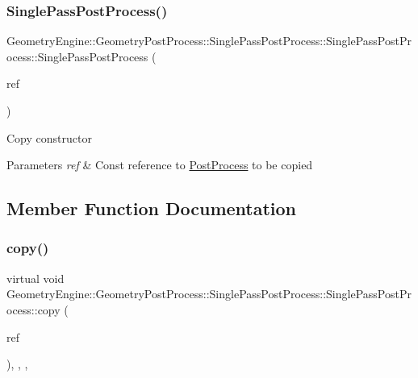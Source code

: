 \subsubsection{\texorpdfstring{SinglePassPostProcess()}{SinglePassPostProcess()}\hspace{0.1cm}{\footnotesize\ttfamily [2/2]}}
{\footnotesize\ttfamily Geometry\+Engine\+::\+Geometry\+Post\+Process\+::\+Single\+Pass\+Post\+Process\+::\+Single\+Pass\+Post\+Process\+::\+Single\+Pass\+Post\+Process (\begin{DoxyParamCaption}\item[{const \mbox{\hyperlink{class_geometry_engine_1_1_geometry_post_process_1_1_single_pass_post_process_1_1_single_pass_post_process}{Single\+Pass\+Post\+Process}} \&}]{ref }\end{DoxyParamCaption})\hspace{0.3cm}{\ttfamily [inline]}}

Copy constructor 
\begin{DoxyParams}{Parameters}
{\em ref} & Const reference to \mbox{\hyperlink{class_geometry_engine_1_1_geometry_post_process_1_1_post_process}{Post\+Process}} to be copied \\
\hline
\end{DoxyParams}


\subsection{Member Function Documentation}
\mbox{\label{class_geometry_engine_1_1_geometry_post_process_1_1_single_pass_post_process_1_1_single_pass_post_process_ab47b36f68057dcff05402a9e5a630878}} 
\subsubsection{\texorpdfstring{copy()}{copy()}}
{\footnotesize\ttfamily virtual void Geometry\+Engine\+::\+Geometry\+Post\+Process\+::\+Single\+Pass\+Post\+Process\+::\+Single\+Pass\+Post\+Process\+::copy (\begin{DoxyParamCaption}\item[{const \mbox{\hyperlink{class_geometry_engine_1_1_geometry_post_process_1_1_post_process}{Post\+Process}} \&}]{ref }\end{DoxyParamCaption})\hspace{0.3cm}{\ttfamily [inline]}, {\ttfamily [override]}, {\ttfamily [protected]}, {\ttfamily [virtual]}}

